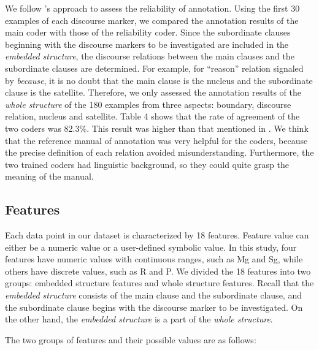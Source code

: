 \documentclass[english]{jnlp_1.3e}
\begin{document}
We follow \cite{Moser95a}'s approach to assess the 
reliability of annotation. Using the first 30 examples of each 
discourse marker, we compared the annotation results 
of the main coder with those of the reliability coder. 
Since the subordinate clauses beginning with the discourse markers 
to be investigated are included in the \textit{embedded structure},
the discourse relations between the main clauses and the subordinate
clauses are determined. For example, for ``reason'' relation signaled
by \textit{because}, it is no doubt that the main clause is the nucleus
and the subordinate clause is the satellite. Therefore, we only assessed 
the annotation results of the \textit{whole structure} of the 180 
examples from three aspects: boundary, discourse relation, 
nucleus and satellite. Table 4 shows that the rate of agreement 
of the two coders was 82.3\%. This result was higher than that 
mentioned in \cite{Moser95a}. We think that the reference 
manual of annotation was very helpful for the coders, because the 
precise definition of each relation avoided misunderstanding.
Furthermore, the two trained coders had linguistic background,
so they could quite grasp the meaning of the manual.  



\subsection{Features}

Each data point in our dataset is characterized by 18 features. 
Feature value can either be a numeric value or a user-defined symbolic 
value. In this study, four features have numeric values with continuous 
ranges, such as Mg and Sg, while others have discrete values, such as R and P. 
We divided the 18 features into two groups: embedded structure features 
and whole structure features. Recall that the \textit{embedded structure} 
consists of the main clause and the subordinate clause, and the subordinate 
clause begins with the discourse marker to be investigated. On the other hand, 
the \textit{embedded structure} is a part of the \textit{whole structure}. 

The two groups of features and their possible values are as follows:  
\end{document}
